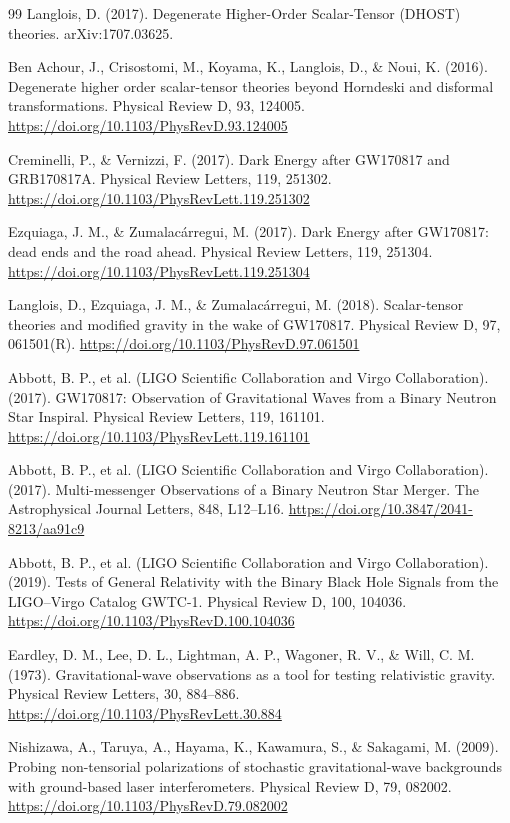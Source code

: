 \begin{thebibliography}{99}
		Langlois, D. (2017). Degenerate Higher-Order Scalar-Tensor (DHOST) theories. arXiv:1707.03625.
		
		Ben Achour, J., Crisostomi, M., Koyama, K., Langlois, D., \& Noui, K. (2016). Degenerate higher order scalar-tensor theories beyond Horndeski and disformal transformations. Physical Review D, 93, 124005. \url{https://doi.org/10.1103/PhysRevD.93.124005}
		
		Creminelli, P., \& Vernizzi, F. (2017). Dark Energy after GW170817 and GRB170817A. Physical Review Letters, 119, 251302. \url{https://doi.org/10.1103/PhysRevLett.119.251302}
		
		Ezquiaga, J. M., \& Zumalacárregui, M. (2017). Dark Energy after GW170817: dead ends and the road ahead. Physical Review Letters, 119, 251304. \url{https://doi.org/10.1103/PhysRevLett.119.251304}
		
		Langlois, D., Ezquiaga, J. M., \& Zumalacárregui, M. (2018). Scalar-tensor theories and modified gravity in the wake of GW170817. Physical Review D, 97, 061501(R). \url{https://doi.org/10.1103/PhysRevD.97.061501}
		
		Abbott, B. P., et al. (LIGO Scientific Collaboration and Virgo Collaboration). (2017). GW170817: Observation of Gravitational Waves from a Binary Neutron Star Inspiral. Physical Review Letters, 119, 161101. \url{https://doi.org/10.1103/PhysRevLett.119.161101}
		
		Abbott, B. P., et al. (LIGO Scientific Collaboration and Virgo Collaboration). (2017). Multi-messenger Observations of a Binary Neutron Star Merger. The Astrophysical Journal Letters, 848, L12–L16. \url{https://doi.org/10.3847/2041-8213/aa91c9}
		
		Abbott, B. P., et al. (LIGO Scientific Collaboration and Virgo Collaboration). (2019). Tests of General Relativity with the Binary Black Hole Signals from the LIGO–Virgo Catalog GWTC-1. Physical Review D, 100, 104036. \url{https://doi.org/10.1103/PhysRevD.100.104036}
		
		Eardley, D. M., Lee, D. L., Lightman, A. P., Wagoner, R. V., \& Will, C. M. (1973). Gravitational-wave observations as a tool for testing relativistic gravity. Physical Review Letters, 30, 884–886. \url{https://doi.org/10.1103/PhysRevLett.30.884}
		
		Nishizawa, A., Taruya, A., Hayama, K., Kawamura, S., \& Sakagami, M. (2009). Probing non-tensorial polarizations of stochastic gravitational-wave backgrounds with ground-based laser interferometers. Physical Review D, 79, 082002. \url{https://doi.org/10.1103/PhysRevD.79.082002}
		

\end{thebibliography}
